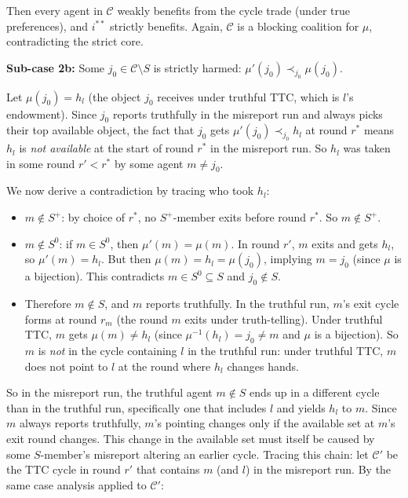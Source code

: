 {  Then every agent in $\mathcal{C}$ weakly benefits from the cycle
  trade (under true preferences), and $i^{**}$ strictly benefits.
  Again, $\mathcal{C}$ is a blocking coalition for $\mu$,
  contradicting the strict core.

  \medskip
  \noindent\textbf{Sub-case 2b:} Some $j_0 \in \mathcal{C} \setminus
  S$ is strictly harmed: $\mu'(j_0) \prec_{j_0} \mu(j_0)$.

  Let $\mu(j_0) = h_l$ (the object $j_0$ receives under truthful
  TTC, which is $l$'s endowment). Since $j_0$ reports truthfully
  in the misreport run and always picks their top available object,
  the fact that $j_0$ gets $\mu'(j_0) \prec_{j_0} h_l$ at round
  $r^*$ means $h_l$ is \emph{not available} at the start of round
  $r^*$ in the misreport run. So $h_l$ was taken in some round
  $r' < r^*$ by some agent $m \neq j_0$.

  We now derive a contradiction by tracing who took $h_l$:

  \begin{itemize}
    \item $m \notin S^+$: by choice of $r^*$, no $S^+$-member exits
    before round $r^*$. So $m \notin S^+$.

    \item $m \notin S^0$: if $m \in S^0$, then $\mu'(m) = \mu(m)$.
    In round $r'$, $m$ exits and gets $h_l$, so $\mu'(m) = h_l$.
    But then $\mu(m) = h_l = \mu(j_0)$, implying $m = j_0$ (since
    $\mu$ is a bijection). This contradicts $m \in S^0 \subseteq S$
    and $j_0 \notin S$.

    \item Therefore $m \notin S$, and $m$ reports truthfully. In the
    truthful run, $m$'s exit cycle forms at round $r_m$ (the round
    $m$ exits under truth-telling). Under truthful TTC, $m$ gets
    $\mu(m) \neq h_l$ (since $\mu^{-1}(h_l) = j_0 \neq m$ and
    $\mu$ is a bijection). So $m$ is \emph{not} in the cycle
    containing $l$ in the truthful run: under truthful TTC, $m$
    does not point to $l$ at the round where $h_l$ changes hands.
  \end{itemize}

  So in the misreport run, the truthful agent $m \notin S$ ends up
  in a different cycle than in the truthful run, specifically one
  that includes $l$ and yields $h_l$ to $m$. Since $m$ always
  reports truthfully, $m$'s pointing changes only if the available
  set at $m$'s exit round changes. This change in the available set
  must itself be caused by some $S$-member's misreport altering an
  earlier cycle. Tracing this chain: let $\mathcal{C}'$ be the TTC
  cycle in round $r'$ that contains $m$ (and $l$) in the misreport
  run. By the same case analysis applied to $\mathcal{C}'$:

}
